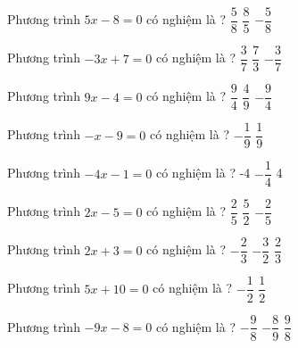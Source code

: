 \begin{ex} 
 Phương trình $5x-8=0$ có nghiệm là ? 
 {$ \dfrac{ 5 }{ 8 } $} 
 {\True $ \dfrac{ 8 }{ 5 } $} 
 {$- \dfrac{ 5 }{ 8 } $}  
 \loigiai{} 
 \end{ex} 
 
\begin{ex} 
 Phương trình $-3x+7=0$ có nghiệm là ? 
 {$ \dfrac{ 3 }{ 7 } $} 
 {\True $ \dfrac{ 7 }{ 3 } $} 
 {$- \dfrac{ 3 }{ 7 } $}  
 \loigiai{} 
 \end{ex} 
 
\begin{ex} 
 Phương trình $9x-4=0$ có nghiệm là ? 
 {$ \dfrac{ 9 }{ 4 } $} 
 {\True $ \dfrac{ 4 }{ 9 } $} 
 {$- \dfrac{ 9 }{ 4 } $}  
 \loigiai{} 
 \end{ex} 
 
\begin{ex} 
 Phương trình $-x-9=0$ có nghiệm là ? 
 {$- \dfrac{ 1 }{ 9 } $} 
 {} 
 {$ \dfrac{ 1 }{ 9 } $}  
 \loigiai{} 
 \end{ex} 
 
\begin{ex} 
 Phương trình $-4x-1=0$ có nghiệm là ? 
 {-4} 
 {\True $- \dfrac{ 1 }{ 4 } $} 
 {4}  
 \loigiai{} 
 \end{ex} 
 
\begin{ex} 
 Phương trình $2x-5=0$ có nghiệm là ? 
 {$ \dfrac{ 2 }{ 5 } $} 
 {\True $ \dfrac{ 5 }{ 2 } $} 
 {$- \dfrac{ 2 }{ 5 } $}  
 \loigiai{} 
 \end{ex} 
 
\begin{ex} 
 Phương trình $2x+3=0$ có nghiệm là ? 
 {$- \dfrac{ 2 }{ 3 } $} 
 {\True $- \dfrac{ 3 }{ 2 } $} 
 {$ \dfrac{ 2 }{ 3 } $}  
 \loigiai{} 
 \end{ex} 
 
\begin{ex} 
 Phương trình $5x+10=0$ có nghiệm là ? 
 {$- \dfrac{ 1 }{ 2 } $} 
 {} 
 {$ \dfrac{ 1 }{ 2 } $}  
 \loigiai{} 
 \end{ex} 
 
\begin{ex} 
 Phương trình $-9x-8=0$ có nghiệm là ? 
 {$- \dfrac{ 9 }{ 8 } $} 
 {\True $- \dfrac{ 8 }{ 9 } $} 
 {$ \dfrac{ 9 }{ 8 } $}  
 \loigiai{} 
 \end{ex} 
 
